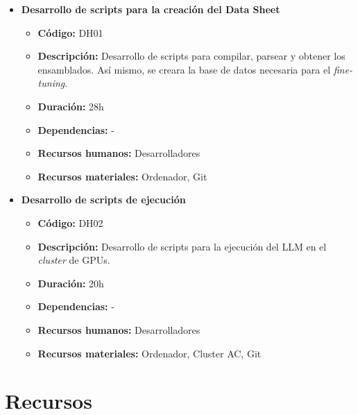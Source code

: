 
\begin{itemize}
    \item \textbf{Desarrollo de scripts para la creación del Data Sheet}
        \begin{itemize}
            \item \textbf{Código:} DH01
            \item \textbf{Descripción:} Desarrollo de scripts para compilar, parsear y obtener los ensamblados. Así mismo, se creara la base de datos
                necesaria para el \textit{fine-tuning}.
            \item \textbf{Duración:} 28h
            \item \textbf{Dependencias:} -
            \item \textbf{Recursos humanos:} Desarrolladores
            \item \textbf{Recursos materiales:} Ordenador, Git
        \end{itemize}
    \item \textbf{Desarrollo de scripts de ejecución}
        \begin{itemize}
            \item \textbf{Código:} DH02
            \item \textbf{Descripción:} Desarrollo de scripts para la ejecución del LLM en el \textit{cluster} de GPUs.
            \item \textbf{Duración:} 20h
            \item \textbf{Dependencias:} -
            \item \textbf{Recursos humanos:} Desarrolladores
            \item \textbf{Recursos materiales:} Ordenador, Cluster AC, Git
        \end{itemize}
\end{itemize}

\section{Recursos}
\label{sec:recursos}
